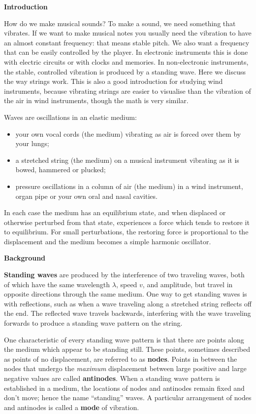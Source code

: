 \bigskip
\textbf{Introduction}

How do we make musical sounds? To make a sound, we need something that vibrates. If we want to make musical notes you usually need the vibration to
have an almost constant frequency: that means stable pitch. We also want a frequency that can be easily controlled by the player. In electronic
instruments this is done with electric circuits or with clocks and memories. In non-electronic instruments, the stable, controlled vibration is
produced by a standing wave. Here we discuss the way strings work. This is also a good introduction for studying wind instruments, because vibrating
strings are easier to visualise than the vibration of the air in wind instruments, though the math is very similar.

Waves are oscillations in an elastic medium:
\begin{itemize}
\item  your own vocal cords (the medium) vibrating as air is forced over them by your lungs; 
\item  a stretched string (the medium) on a musical instrument vibrating as it is bowed, hammered or plucked; 
\item  pressure oscillations in a column of air (the medium) in a wind instrument, organ pipe or your own oral and nasal cavities.
\end{itemize}

In each case the medium has an equilibrium state, and when displaced or otherwise perturbed from that state, experiences a force which tends to
restore it to equilibrium. For small perturbations, the restoring force is proportional to the displacement and the medium becomes a simple harmonic
oscillator.


\textbf{Background}

\textbf{Standing waves} are produced by the interference of two traveling waves, both of which have the
same wavelength $\lambda$, speed $v$, and amplitude, but travel in opposite directions through the same medium. 
One way to get standing waves is with reflections, such as when a wave traveling along a stretched string reflects off the end.  The reflected wave travels backwards, interfering with the wave traveling forwards to produce a standing wave pattern on the string.  

One characteristic of every standing wave pattern is that there are points along the medium which appear to be standing still. These points,
sometimes described as points of no displacement, are referred to as \textbf{nodes}. Points in between the nodes that undergo the \textit{maximum} displacement between
large positive and large negative values are called \textbf{antinodes}. When a standing wave pattern is established in a medium, the locations of nodes and antinodes remain fixed and don't move; hence the name ``standing'' waves.  A particular arrangement of nodes and antinodes is called a \textbf{mode} of vibration.


